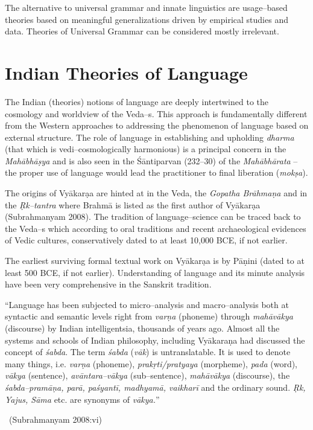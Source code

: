 The alternative to universal grammar and innate linguistics are usage–based theories based on meaningful generalizations driven by empirical studies and data. Theories of Universal Grammar can be considered mostly irrelevant. 

\vskip -26pt


\section*{Indian Theories of Language}

\vskip -6pt

The Indian (theories) notions of language are deeply intertwined to the cosmology and worldview of the Veda–s. This approach is fundamentally different from the Western approaches to addressing the phenomenon of language based on external structure. The role of language in establishing and upholding \textit{dharma} (that which is vedi–cosmologically harmonious) is a principal concern in the \textit{Mahābhāṣya} and is also seen in the Śāntiparvan (232–30) of the \textit{Mahābhārata} – the proper use of language would lead the practitioner to final liberation (\textit{mokṣa}).

The origins of Vyākarạa are hinted at in the Veda, the \textit{Gopatha Brāhmaṇa} and in the \textit{Ṛk–tantra} where Brahmā is listed as the first author of Vyākarạa (Subrahmanyam 2008). The tradition of language–science can be traced back to the Veda–s which according to oral traditions and recent archaeological evidences of Vedic cultures, conservatively dated to at least 10,000 BCE, if not earlier.

The earliest surviving formal textual work on Vyākarạa is by Pāṇini (dated to at least 500 BCE, if not earlier). Understanding of language and its minute analysis have been very comprehensive in the Sanskrit tradition.

\begin{myquote}
“Language has been subjected to micro–analysis and macro–analysis both at syntactic and semantic levels right from \textit{varṇa} (phoneme) through \textit{mahāvākya} (discourse) by Indian intelligentsia, thousands of years ago. Almost all the systems and schools of Indian philosophy, including Vyākaraṇa had discussed the concept of \textit{śabda}. The term \textit{śabda} (\textit{vāk}) is untranslatable. It is used to denote many things, i.e. \textit{varṇa} (phoneme), \textit{prakṛti/pratyaya} (morpheme), \textit{pada} (word), \textit{vākya} (sentence), \textit{avāntara–vākya} (sub–sentence), \textit{mahāvākya} (discourse), the \textit{śabda–pramāṇa, parā, paśyantī, madhyamā, vaikharī} and the ordinary sound. \textit{Ṛk, Yajus, Sāma} etc. are synonyms of \textit{vākya.}”

~\hfill (Subrahmanyam 2008:vi)
\end{myquote}

